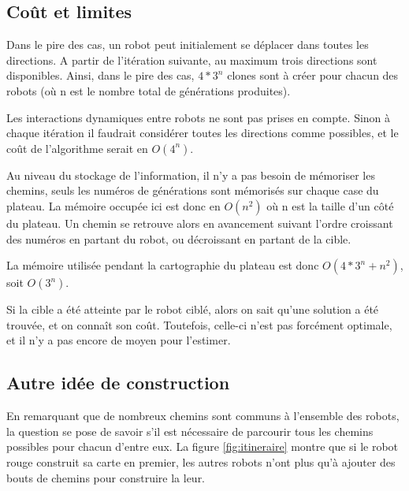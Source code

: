 \documentclass[a4paper,11pt]{article}
\begin{document}
\subsection{Co\^ut et limites}
Dans le pire des cas, un robot peut initialement se d\'eplacer dans toutes les directions. A partir de l'it\'eration suivante, au maximum trois directions sont disponibles. Ainsi, dans le pire des cas, $4*3^n$ clones sont \`a cr\'eer pour chacun des robots (o\`u n est le nombre total de g\'en\'erations produites).
\par Les interactions dynamiques entre robots ne sont pas prises en compte. Sinon \`a chaque it\'eration il faudrait consid\'erer toutes les directions comme possibles, et le co\^ut de l'algorithme serait en $O(4^n)$.
\par Au niveau du stockage de l'information, il n'y a pas besoin de m\'emoriser les chemins, seuls les num\'eros de g\'en\'erations sont m\'emoris\'es sur chaque case du plateau. La m\'emoire occup\'ee ici est donc en $O(n^2)$ o\`u n est la taille d'un c\^ot\'e du plateau. Un chemin se retrouve alors en avancement suivant l'ordre croissant des num\'eros en partant du robot, ou d\'ecroissant en partant de la cible.
\par La m\'emoire utilis\'ee pendant la cartographie du plateau est donc $O(4*3^n + n^2)$, soit $O(3^n)$.
\par Si la cible a \'et\'e atteinte par le robot cibl\'e, alors on sait qu'une solution a \'et\'e trouv\'ee, et on conna\^it son co\^ut. Toutefois, celle-ci n'est pas forc\'ement optimale, et il n'y a pas encore de moyen pour l'estimer.

\newpage
\subsection{Autre id\'ee de construction}
En remarquant que de nombreux chemins sont communs \`a l'ensemble des robots, la question se pose de savoir s'il est n\'ecessaire de parcourir tous les chemins possibles pour chacun d'entre eux. La figure \ref{fig:itineraire} montre que si le robot rouge construit sa carte en premier, les autres robots n'ont plus qu'\`a ajouter des bouts de chemins pour construire la leur.
\end{document}
